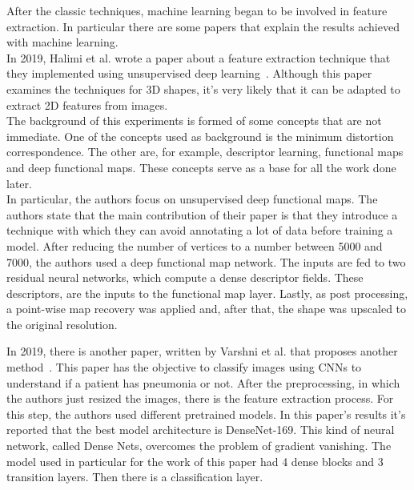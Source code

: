 \documentclass[conference]{IEEEtran}
\begin{document}
					After the classic techniques, machine learning began to be involved in feature extraction. In particular there are some papers that explain the results achieved with machine learning.\\
					In 2019, Halimi et al. wrote a paper about a feature extraction technique that they implemented using unsupervised deep learning~\cite{halimi2019unsupervised}. Although this paper examines the techniques for 
					3D shapes, it's very likely that it can be adapted to extract 2D features from images.\\
					The background of this experiments is formed of some concepts that are not immediate. One of the concepts used as background is the minimum distortion correspondence. The other are, for example, 
					descriptor learning, functional maps and deep functional maps. These concepts serve as a base for all the work done later. \\
					In particular, the authors focus on unsupervised deep functional maps. The authors state that the main contribution of their paper is that they introduce a technique with which they can 
					avoid annotating a lot of data before training a model. After reducing the number of vertices to a number between 5000 and 7000, the authors used a deep functional map network. The inputs are 
					fed to two residual neural networks, which compute a dense descriptor fields. These descriptors, are the inputs to the functional map layer. Lastly, as post processing, a point-wise map recovery was 
					applied and, after that, the shape was upscaled to the original resolution. 
					
					\noindent In 2019, there is another paper, written by Varshni et al. that proposes another method~\cite{varshni2019pneumonia}. This paper has the objective to classify images using CNNs to understand if a patient 
					has pneumonia or not. After the preprocessing, in which the authors just resized the images, there is the feature extraction process. For this step, the authors used different pretrained models.
					In this paper's results it's reported that the best model architecture is DenseNet-169. This kind of neural network, called Dense Nets, overcomes the problem of gradient vanishing. The model used in 
					particular for the work of this paper had 4 dense blocks and 3 transition layers. Then there is a classification layer. 
					
\end{document}
